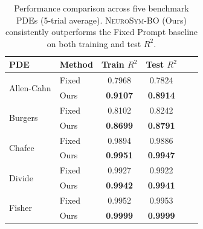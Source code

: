 \begin{table}[!htbp]
\centering
\small
\begin{tabular}{llcccc}
\toprule
\textbf{PDE} & \textbf{Method} & \textbf{Train $R^2$} & \textbf{Test $R^2$} \\
\midrule
\multirow{2}{*}{Allen-Cahn} & Fixed & 0.7968 & 0.7824   \\
 & Ours & \textbf{0.9107} & \textbf{0.8914}   \\
 \midrule
\multirow{2}{*}{Burgers} & Fixed & 0.8102 & 0.8242   \\
 & Ours & \textbf{0.8699} & \textbf{0.8791} \\
\midrule
\multirow{2}{*}{Chafee} & Fixed & 0.9894 & 0.9886 \\
 & Ours & \textbf{0.9951} & \textbf{0.9947}  \\
\midrule
\multirow{2}{*}{Divide} & Fixed & 0.9927 & 0.9922  \\
 & Ours & \textbf{0.9942} & \textbf{0.9941} \\
\midrule
\multirow{2}{*}{Fisher} & Fixed & 0.9952 & 0.9953  \\
 & Ours & \textbf{0.9999} & \textbf{0.9999} \\
\bottomrule
\end{tabular}
\caption{\small Performance comparison across five benchmark PDEs (5-trial average). 
\textsc{NeuroSym-BO} (Ours) consistently outperforms the Fixed Prompt baseline 
on both training and test $R^2$.}
\label{tab:results}

\end{table}




